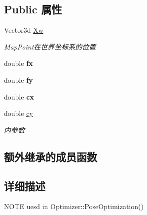 \subsection*{Public 属性}
\begin{DoxyCompactItemize}
\item 
\hypertarget{classg2o_1_1EdgeSE3ProjectXYZOnlyPose_a66318605e8e9c2276b100cf73e718ea8}{Vector3d \hyperlink{classg2o_1_1EdgeSE3ProjectXYZOnlyPose_a66318605e8e9c2276b100cf73e718ea8}{Xw}}\label{classg2o_1_1EdgeSE3ProjectXYZOnlyPose_a66318605e8e9c2276b100cf73e718ea8}

\begin{DoxyCompactList}\small\item\em Map\-Point在世界坐标系的位置 \end{DoxyCompactList}\item 
\hypertarget{classg2o_1_1EdgeSE3ProjectXYZOnlyPose_a413ca1179697e29d5476f582d2b29ff6}{double {\bfseries fx}}\label{classg2o_1_1EdgeSE3ProjectXYZOnlyPose_a413ca1179697e29d5476f582d2b29ff6}

\item 
\hypertarget{classg2o_1_1EdgeSE3ProjectXYZOnlyPose_a2f645f770962dc9d8c4862c0c6dbb497}{double {\bfseries fy}}\label{classg2o_1_1EdgeSE3ProjectXYZOnlyPose_a2f645f770962dc9d8c4862c0c6dbb497}

\item 
\hypertarget{classg2o_1_1EdgeSE3ProjectXYZOnlyPose_ab4d7078a2d9a628afd6022c983843904}{double {\bfseries cx}}\label{classg2o_1_1EdgeSE3ProjectXYZOnlyPose_ab4d7078a2d9a628afd6022c983843904}

\item 
\hypertarget{classg2o_1_1EdgeSE3ProjectXYZOnlyPose_aa6f6f24382d0f9b03d6ae47747e6d95d}{double \hyperlink{classg2o_1_1EdgeSE3ProjectXYZOnlyPose_aa6f6f24382d0f9b03d6ae47747e6d95d}{cy}}\label{classg2o_1_1EdgeSE3ProjectXYZOnlyPose_aa6f6f24382d0f9b03d6ae47747e6d95d}

\begin{DoxyCompactList}\small\item\em 内参数 \end{DoxyCompactList}\end{DoxyCompactItemize}
\subsection*{额外继承的成员函数}


\subsection{详细描述}
N\-O\-T\-E uesd in Optimizer\-::\-Pose\-Optimization() 

